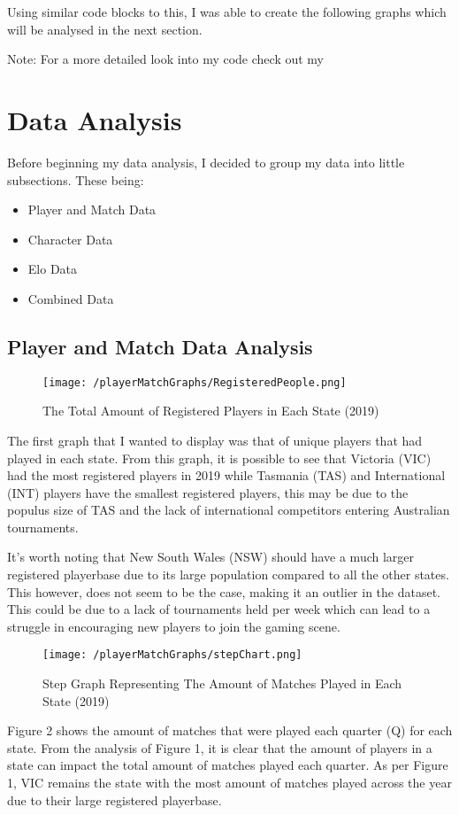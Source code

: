 \documentclass[11pt, oneside, a4paper]{article}
\begin{document}
Using similar code blocks to this, I was able to create the following graphs which will be analysed in the next section.

Note: For a more detailed look into my code check out my %
\newpage

\section{Data Analysis}
Before beginning my data analysis, I decided to group my data into little subsections. These being:
\begin{itemize}
	\item{Player and Match Data}
	\item{Character Data}
	\item{Elo Data}
	\item{Combined Data}
\end{itemize}


\subsection{Player and Match Data Analysis}
\begin{figure}[!ht]
	\centerline{\texttt{[image: /playerMatchGraphs/RegisteredPeople.png]}}
	\caption{The Total Amount of Registered Players in Each State (2019)}
	\label{fig:figure1}
\end{figure}
The first graph that I wanted to display was that of unique players that had played in each state. From this graph, it is possible to see that Victoria (VIC) had the most registered players in 2019 while Tasmania (TAS) and International (INT) players have the smallest registered players, this may be due to the populus size of TAS and the lack of international competitors entering Australian tournaments. 

It's worth noting that New South Wales (NSW) should have a much larger registered playerbase due to its large population compared to all the other states. This however, does not seem to be the case, making it an outlier in the dataset. This could be due to a lack of tournaments held per week which can lead to a struggle in encouraging new players to join the gaming scene.

\newpage

\begin{figure}[!ht]
	\centerline{\texttt{[image: /playerMatchGraphs/stepChart.png]}}
	\caption{Step Graph Representing The Amount of Matches Played in Each State (2019)}
	\label{fig:figure2}
\end{figure}
Figure 2 shows the amount of matches that were played each quarter (Q) for each state. From the analysis of Figure 1, it is clear that the amount of players in a state can impact the total amount of matches played each quarter. As per Figure 1, VIC remains the state with the most amount of matches played across the year due to their large registered playerbase. 
\end{document}
